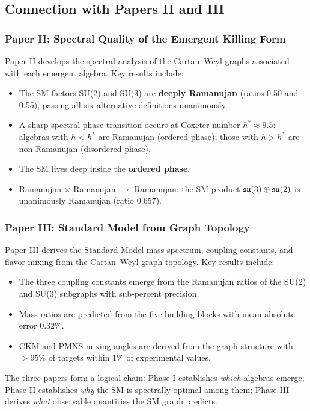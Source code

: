 \subsection{Connection with Papers II and III}\label{sec:connection_papers}

\subsubsection{Paper II: Spectral Quality of the Emergent Killing Form}

Paper II develops the spectral analysis of the Cartan--Weyl graphs associated with each emergent algebra. Key results include:

\begin{itemize}
\item The SM factors SU(2) and SU(3) are \textbf{deeply Ramanujan} (ratios 0.50 and 0.55), passing all six alternative definitions unanimously.
\item A sharp spectral phase transition occurs at Coxeter number $h^* \approx 9.5$: algebras with $h < h^*$ are Ramanujan (ordered phase); those with $h > h^*$ are non-Ramanujan (disordered phase).
\item The SM lives deep inside the \textbf{ordered phase}.
\item Ramanujan $\times$ Ramanujan $\to$ Ramanujan: the SM product $\mathfrak{su}(3) \oplus \mathfrak{su}(2)$ is unanimously Ramanujan (ratio 0.657).
\end{itemize}

\subsubsection{Paper III: Standard Model from Graph Topology}

Paper III derives the Standard Model mass spectrum, coupling constants, and flavor mixing from the Cartan--Weyl graph topology. Key results include:

\begin{itemize}
\item The three coupling constants emerge from the Ramanujan ratios of the SU(2) and SU(3) subgraphs with sub-percent precision.
\item Mass ratios are predicted from the five building blocks with mean absolute error 0.32\%.
\item CKM and PMNS mixing angles are derived from the graph structure with $> 95\%$ of targets within 1\% of experimental values.
\end{itemize}

The three papers form a logical chain: Phase I establishes \textit{which} algebras emerge; Phase II establishes \textit{why} the SM is spectrally optimal among them; Phase III derives \textit{what} observable quantities the SM graph predicts.
